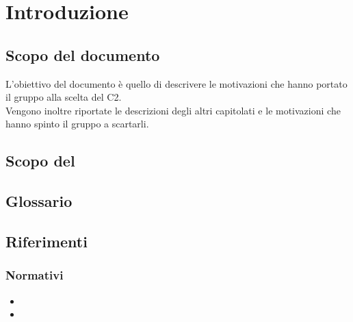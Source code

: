 \section {Introduzione}
	\subsection {Scopo del documento}
		L'obiettivo del documento è quello di descrivere le motivazioni che hanno portato il gruppo \GRUPPO{} alla scelta del  C2.  \\
		Vengono inoltre riportate le descrizioni degli altri capitolati e le motivazioni che hanno spinto il gruppo a scartarli.
	\subsection {Scopo del }
		\SCOPO
	\subsection {Glossario}
		\GLOSSARIO
	\subsection {Riferimenti}
		\subsubsection {Normativi}
			\begin {itemize}
				\item \NPdoc
				\item \GldocRR
			\end {itemize}
